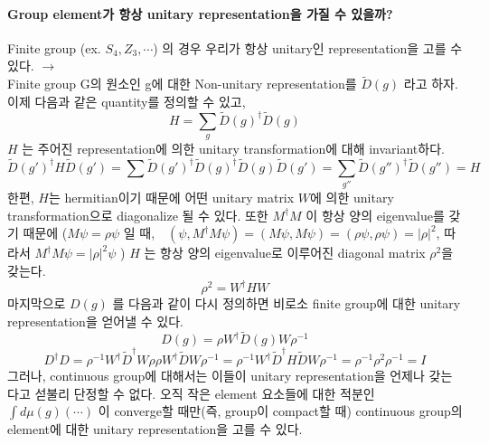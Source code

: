 \documentclass[a4paper,12pt]{report}
\begin{document}
	\paragraph{Group element가 항상 unitary representation을 가질 수 있을까?}
	Finite group (ex. $S_4,Z_3,\cdots$) 의 경우 우리가 항상 unitary인 representation을 고를 수 있다. $\rightarrow$\\
	Finite group G의 원소인 g에 대한 Non-unitary representation를  $\tilde{D}(g)$ 라고 하자. 이제 다음과 같은 quantity를 정의할 수 있고,
	$$H=\sum_{g}\tilde{D}(g)^\dagger\tilde{D}(g)$$
	$H$ 는 주어진 representation에 의한 unitary transformation에 대해 invariant하다.
	$$\tilde{D}(g')^\dagger H\tilde{D}(g')=\sum\tilde{D}(g')^\dagger\tilde{D}(g)^\dagger\tilde{D}(g)\tilde{D}(g')=\sum_{g''}\tilde{D}(g'')^\dagger\tilde{D}(g'')=H$$
	한편, $H$는 hermitian이기 때문에 어떤 unitary matrix $W$에 의한 unitary transformation으로 diagonalize 될 수 있다. 또한 $M^\dagger M$ 이 항상 양의 eigenvalue를 갖기 때문에 ($M\psi=\rho\psi$ 일 때,$\quad \left(\psi,M^\dagger M\psi \right)=\left(M\psi, M\psi \right)=\left(\rho\psi,\rho\psi \right)=\left|\rho \right|^2  $, 따라서 $M^\dagger M\psi=\left|\rho \right|^2\psi$ ) $H$ 는 항상 양의 eigenvalue로 이루어진 diagonal matrix $\rho^2$을 갖는다.
	$$\rho^2=W^\dagger H W$$ 
	마지막으로 $D(g)$ 를 다음과 같이 다시 정의하면 비로소 finite group에 대한 unitary representation을 얻어낼 수 있다. 
	$$D(g)=\rho W^\dagger \tilde{D}(g)W\rho^{-1}$$ 
	$$D^\dagger D=\rho^{-1}W^\dagger\tilde{D}^\dagger W\rho\rho W^\dagger\tilde{D}W\rho^{-1}=\rho^{-1}W^\dagger\tilde{D}^\dagger H\tilde{D}W\rho^{-1}=\rho^{-1}\rho^2\rho^{-1}=I$$
	그러나, continuous group에 대해서는 이들이 unitary representation을 언제나 갖는다고 섣불리 단정할 수 없다. 오직 작은 element 요소들에 대한 적분인 $\int d\mu(g)(\cdots)$ 이 converge할 때만(즉, group이 compact할 때) continuous group의  element에 대한 unitary representation을 고를 수 있다. 
	
\end{document}
